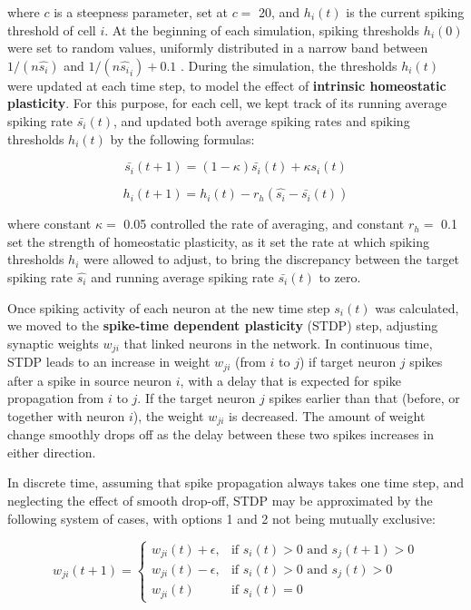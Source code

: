 \documentclass{article}
\begin{document}
where $c$ is a steepness parameter, set at $c=$ 20, and $h_i(t)$ is the current spiking threshold of cell $i$. At the beginning of each simulation, spiking thresholds $h_i(0)$ were set to random values, uniformly distributed in a narrow band between $1/(n \hat{s_i})$ and $1/(n \hat{s_i}_i)+0.1$ . During the simulation, the thresholds $h_i(t)$ were updated at each time step, to model the effect of \textbf{intrinsic homeostatic plasticity}. For this purpose, for each cell, we kept track of its running average spiking rate $\bar{s_i}(t)$, and updated both average spiking rates and spiking thresholds $h_i(t)$ by the following formulas:

\[ \bar{s_i}(t+1) = (1-\kappa)\bar{s_i}(t) + \kappa s_i(t) \]

\[ h_i(t+1) = h_i(t) - r_h(\hat{s_i} - \bar{s_i}(t)) \]

where constant $\kappa=$ 0.05 controlled the rate of averaging, and constant $r_h=$ 0.1 set the strength of homeostatic plasticity, as it set the rate at which spiking thresholds $h_i$ were allowed to adjust, to bring the discrepancy between the target spiking rate $\hat{s_i}$ and running average spiking rate $\bar{s_i}(t)$ to zero.

Once spiking activity of each neuron at the new time step $s_i(t)$ was calculated, we moved to the \textbf{spike-time dependent plasticity} (STDP) step, adjusting synaptic weights $w_{ji}$ that linked neurons in the network. In continuous time, STDP leads to an increase in weight $w_{ji}$ (from $i$ to $j$) if target neuron $j$ spikes after a spike in source neuron $i$, with a delay that is expected for spike  propagation from $i$ to $j$. If the target neuron $j$ spikes earlier than that (before, or together with neuron $i$), the weight $w_{ji}$ is decreased. The amount of weight change smoothly drops off as the delay between these two spikes increases in either direction. 

In discrete time, assuming that spike propagation always takes one time step, and neglecting the effect of smooth drop-off, STDP may be approximated by the following system of cases, with options 1 and 2 not being mutually exclusive:

\[ w_{ji}(t+1) = \left \{ \begin{array}{lll} w_{ji}(t)+\epsilon, & \text{if } s_i(t)> 0 \text{ and } s_j(t+1)> 0 \\ w_{ji}(t)-\epsilon, & \text{if } s_i(t)> 0 \text{ and } s_j(t)> 0 \\ w_{ji}(t) & \text{if } s_i(t)=0\end{array} \right. \]
\end{document}
